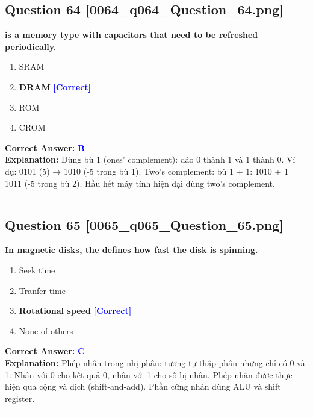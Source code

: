 \documentclass[11pt,a4paper]{article}
\begin{document}
\begin{minipage}{\textwidth}
\subsection*{Question 64 \quad \footnotesize{[0064\_q064\_Question\_64.png]}}
\noindent \textbf{is a memory type with capacitors that need to be refreshed periodically.}

\begin{enumerate}[label=\Alph*.]
    \item SRAM
    \item \textbf{DRAM} \hfill \textcolor{blue}{\textbf{[Correct]}}
    \item ROM
    \item CROM
\end{enumerate}

\noindent \textbf{Correct Answer:} \textcolor{blue}{\textbf{B}} \\[2pt]
\noindent \textbf{Explanation:} Dùng bù 1 (ones' complement): đảo 0 thành 1 và 1 thành 0. Ví dụ: 0101 (5) → 1010 (-5 trong bù 1). Two's complement: bù 1 + 1: 1010 + 1 = 1011 (-5 trong bù 2). Hầu hết máy tính hiện đại dùng two's complement.

\par\vspace{0.3cm}
\hrule
\vspace{0.3cm}
\end{minipage}

\begin{minipage}{\textwidth}
\subsection*{Question 65 \quad \footnotesize{[0065\_q065\_Question\_65.png]}}
\noindent \textbf{In magnetic disks, the defines how fast the disk is spinning.}

\begin{enumerate}[label=\Alph*.]
    \item Seek time
    \item Tranfer time
    \item \textbf{Rotational speed} \hfill \textcolor{blue}{\textbf{[Correct]}}
    \item None of others
\end{enumerate}

\noindent \textbf{Correct Answer:} \textcolor{blue}{\textbf{C}} \\[2pt]
\noindent \textbf{Explanation:} Phép nhân trong nhị phân: tương tự thập phân nhưng chỉ có 0 và 1. Nhân với 0 cho kết quả 0, nhân với 1 cho số bị nhân. Phép nhân được thực hiện qua cộng và dịch (shift-and-add). Phần cứng nhân dùng ALU và shift register.

\par\vspace{0.3cm}
\hrule
\vspace{0.3cm}
\end{minipage}
\end{document}
